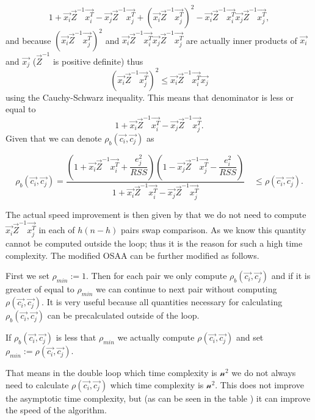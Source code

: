 \begin{equation}
    1 + \vec{x_i}\vec{Z}^{-1}\vec{x_i^T}  - \vec{x_j}\vec{Z}^{-1}\vec{x_j^T}  + (\vec{x_i}\vec{Z}^{-1}\vec{x_j^T})^2 -   \vec{x_i}\vec{Z}^{-1}\vec{x_i^T}\vec{x_j}\vec{Z}^{-1}\vec{x_j^T}, 
\end{equation}
and because $(\vec{x_i}\vec{Z}^{-1}\vec{x_j^T})^2$ and $\vec{x_i}\vec{Z}^{-1}\vec{x_i^T}\vec{x_j}\vec{Z}^{-1}\vec{x_j^T} $ are actually inner products of $\vec{x_i}$ and $\vec{x_j}$  ($\vec{Z}^{-1}$ is positive definite) thus
\begin{equation}
    (\vec{x_i}\vec{Z}^{-1}\vec{x_j^T})^2 \leq \vec{x_i}\vec{Z}^{-1}\vec{x_i^T}\vec{x_j}
\end{equation}
using the Cauchy-Schwarz inequality. This means that denominator is less or equal to
\begin{equation}
    1 + \vec{x_i}\vec{Z}^{-1}\vec{x_i^T}  - \vec{x_j}\vec{Z}^{-1}\vec{x_j^T}.
\end{equation}
Given that we can denote $\rho_b(\vec{c_i}, \vec{c_j})$  as

\begin{equation} \label{boundingcondition}
\rho_b(\vec{c_i}, \vec{c_j}) = \dfrac{(1+\vec{x_i}\vec{Z}^{-1}\vec{x_i^T} + \dfrac{e_j^2}{RSS})
    (1 - \vec{x_j}\vec{Z}^{-1}\vec{x_j^T} - \dfrac{e_i^2}{RSS} )}{1 + \vec{x_i}\vec{Z}^{-1}\vec{x_i^T}  - \vec{x_j}\vec{Z}^{-1}\vec{x_j^T}} \quad \leq \rho(\vec{c_i}, \vec{c_j}).
\end{equation}

The actual speed improvement is then given by that we do not need to compute $\vec{x_i}\vec{Z}^{-1}\vec{x_j^T}$ in each of $h(n-h)$ pairs swap comparison. As we know this quantity cannot be computed outside the loop; thus it is the reason for such a high time complexity. The modified OSAA can be further modified as follows.

First we set $\rho_{min} :=1$. Then for each pair we only compute $\rho_b(\vec{c_i}, \vec{c_j})$ and if it is greater of equal to $\rho_{min}$ we can continue to next pair without computing $\rho(\vec{c_i}, \vec{c_j})$. 
It is very useful because all quantities necessary for calculating $\rho_b(\vec{c_i}, \vec{c_j})$ can be precalculated outside of the loop.

If $\rho_b(\vec{c_i}, \vec{c_j})$ is less that  $\rho_{min}$ we actually compute $\rho(\vec{c_i}, \vec{c_j})$ and set $\rho_{min} := \rho(\vec{c_i}, \vec{c_j})$.

That means in the double loop which time complexity is $\mathcal{n^2}$  we do not always need to calculate $\rho(\vec{c_i}, \vec{c_j})$ which time complexity is $\mathcal{n^2}$. This does not improve the asymptotic time complexity, but (as can be seen in the table ) it can improve the speed of the algorithm. 

